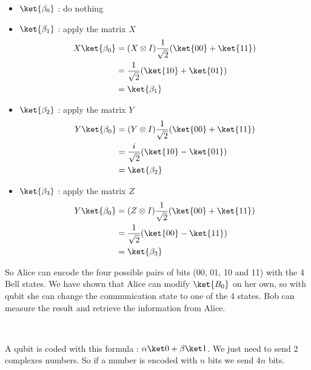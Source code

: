 \begin{itemize}
  \item $\ket{\beta_0}$ : do nothing
  \item $\ket{\beta_1}$ : apply the matrix $X$
    \begin{align*}
      X\ket{\beta_0} &= (X \otimes I) \frac{1}{\sqrt 2}(\ket{00} + \ket{11}) \\
      &= \frac{1}{\sqrt 2}(\ket{10} + \ket{01}) \\
      &= \ket{\beta_1}
    \end{align*}
  \item $\ket{\beta_2}$ : apply the matrix $Y$
    \begin{align*}
      Y\ket{\beta_0} &= (Y \otimes I) \frac{1}{\sqrt 2}(\ket{00} + \ket{11}) \\
      &= \frac{i}{\sqrt 2}(\ket{10} - \ket{01}) \\
      &= \ket{\beta_2}
    \end{align*}
  \item $\ket{\beta_3}$ : apply the matrix $Z$
    \begin{align*}
      Y\ket{\beta_0} &= (Z \otimes I) \frac{1}{\sqrt 2}(\ket{00} + \ket{11}) \\
      &= \frac{1}{\sqrt 2}(\ket{00} - \ket{11}) \\
      &= \ket{\beta_3}
    \end{align*}
\end{itemize}

So Alice can encode the four possible pairs of bits (00, 01, 10 and 11) with the
4 Bell states. We have shown that Alice can modify $\ket{B_0}$ on her own, so
with  qubit she can change the communication state to one of the 4 states. Bob
can measure the result and retrieve the information from Alice.

~

A qubit is coded with this formula : $\alpha \ket 0 + \beta \ket 1$.
We just need to send $2$ complexes numbers. So if a number is encoded with $n$
bits we send $4n$ bits.


\exo[Teleportation]~

